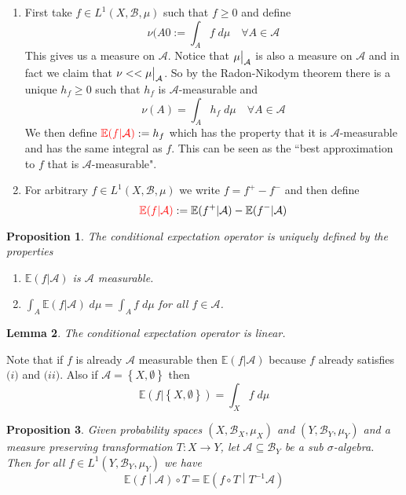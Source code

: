 \documentclass[11pt]{article}
\newcommand{\defeq}{:=}
\newcommand\restr[2]{{%
  \left.\kern-\nulldelimiterspace %
  #1 %
  \vphantom{\big|} %
  \right|_{#2} %
  }}
\newcommand{\relmiddle}[1]{\mathrel{}\middle#1\mathrel{}}
\newcommand{\rmv}{\relmiddle|}
\newcommand{\gvn}[2]{\ensuremath{\left(#1\rmv#2\right)}}
\newcommand{\expg}[2]{\ensuremath{\mathbb{E}\gvn{#1}{#2}}}
\newcommand{\dm}{\;d\mu}
\newcommand{\mdf}[1]{{\color{red} #1}}
\newtheorem{prop}{Proposition}[section]
\newtheorem{lemma}[prop]{Lemma}
\begin{document}
\begin{enumerate}
	\item First take $f\in L^1(X, \mathcal{B}, \mu)$ such that $f\geq 0$ and define
		\[
			\nu(A0 \defeq \int_A f \dm \quad \forall A\in\mathcal{A}
		\]
		This gives us a measure on $\mathcal{A}$.
		Notice that $\restr{\mu}{\mathcal{A}}$ is also a measure on $\mathcal{A}$ and in fact we claim that $\nu << \restr{\mu}{\mathcal{A}}$.
		So by the Radon-Nikodym theorem there is a unique $h_f \geq 0$ such that $h_f$ is $\mathcal{A}$-measurable and
		\[
			\nu(A) = \int_A h_f \dm \quad \forall A\in\mathcal{A}
		\]
		We then define $\mdf{\mathbb{E}(f | \mathcal{A})} \defeq h_f$ which has the property that it is $\mathcal{A}$-measurable and has the same integral as $f$.
		This can be seen as the ``best approximation to $f$ that is $\mathcal{A}$-measurable".
	\item For arbitrary $f\in L^1(X, \mathcal{B}, \mu)$ we write $f= f^+ - f^-$ and then define
		\[
			\mdf{\mathbb{E}(f | \mathcal{A})} \defeq \mathbb{E}(f^+ | \mathcal{A}) - \mathbb{E}(f^- | \mathcal{A})
		\]
\end{enumerate}

\begin{prop}
\label{prop:condexpec}
The conditional expectation operator is uniquely defined by the properties
\begin{enumerate}[label=(\roman*)]
	\item $\mathbb{E}(f | \mathcal{A})$ is $\mathcal{A}$ measurable.
	\item $\int_A \mathbb{E}(f | \mathcal{A})\dm = \int_A f \dm$ for all $f\in \mathcal{A}$.
\end{enumerate}
\end{prop}

\begin{lemma}
The conditional expectation operator is linear.
\end{lemma}

Note that if $f$ is already $\mathcal{A}$ measurable then $\mathbb{E}(f | \mathcal{A})$ because $f$ already satisfies $\textit{(i)}$ and $\textit{(ii)}$.
Also if $\mathcal{A}= \left\{ X, \emptyset\right\}$ then 
\[
	\mathbb{E}(f | \left\{ X, \emptyset\right\} ) = \int_X f \dm
\]

\begin{prop}
Given probability spaces $(X, \mathcal{B}_X, \mu_X)$ and $(Y, \mathcal{B}_Y, \mu_Y)$ and a measure preserving transformation $T:X \to Y$, let $\mathcal{A}\subseteq \mathcal{B}_Y$ be a sub $\sigma$-algebra.
Then for all $f\in L^1(Y, \mathcal{B}_Y, \mu_Y)$ we have
\[
	\expg{f }{ \mathcal{A}} \circ T = \expg{f \circ T}{T^{-1}\mathcal{A}}
\]
\end{prop}
\end{document}
